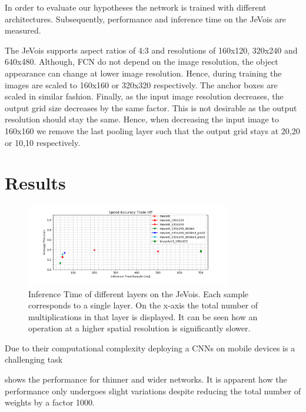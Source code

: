 In order to evaluate our hypotheses the network is trained with different architectures. Subsequently, performance and inference time on the JeVois are measured.

The JeVois supports aspect ratios of 4:3 and resolutions of 160x120, 320x240 and 640x480. Although, \ac{FCN} do not depend on the image resolution, the object appearance can change at lower image resolution. Hence, during training the images are scaled to 160x160 or 320x320 respectively. The anchor boxes are scaled in similar fashion. Finally, as the input image resolution decreases, the output grid size decreases by the same factor. This is not desirable as the output resolution should stay the same. Hence, when decreasing the input image to 160x160 we remove the last pooling layer such that the output grid stays at 20,20 or 10,10 respectively.

\section{Results}

\begin{figure}[hbtp]
	\centering
	\includegraphics[width=0.8\textwidth]{fig/ap_speed_tradeoff}
	\caption{Inference Time of different layers on the JeVois. Each sample corresponds to a single layer. On the x-axis the total number of multiplications in that layer is displayed. It can be seen how an operation at a higher spatial resolution is significantly slower.}
	\label{fig:ap_speed_tradeoff}
\end{figure}

Due to their computational complexity deploying a \acp{CNN} on mobile devices is a challenging task


 shows the performance for thinner and wider networks. It is apparent how the performance only undergoes slight variations despite reducing the total number of weights by a factor 1000. 


